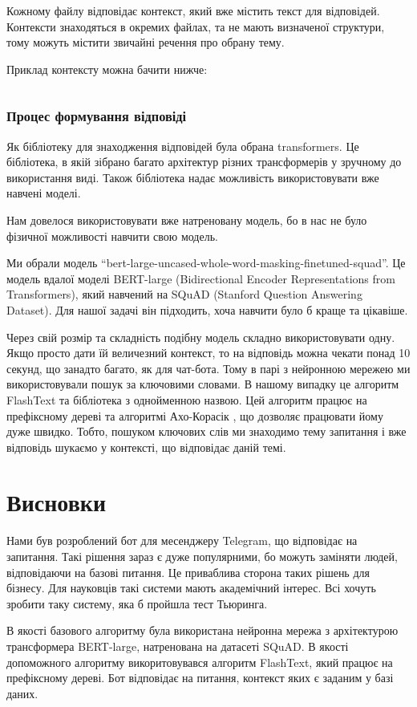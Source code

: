\documentclass[a4paper,14pt]{extreport}
\newcommand\chap[1]{%
  \chapter*{#1}%
  \addcontentsline{toc}{chapter}{\uppercase{#1}}}
\begin{document}
    Кожному файлу відповідає контекст, який вже містить текст для відповідей. Контексти знаходяться в окремих файлах, та не мають визначеної структури, тому можуть містити звичайні речення про обрану тему.

    Приклад контексту можна бачити нижче:

    \inputminted[breaklines,linenos=true]{text}{./ai.txt}

    \subsection{Процес формування відповіді}
    Як бібліотеку для знаходження відповідей була обрана transformers. Це бібліотека, в якій зібрано багато архітектур різних трансформерів у зручному до використання виді. Також бібліотека надає можливість використовувати вже навчені моделі.
    
    Нам довелося використовувати вже натреновану модель, бо в нас не було фізичної можливості навчити свою модель.

    Ми обрали модель ``bert-large-uncased-whole-word-masking-finetuned-squad''. Це модель вдалої моделі BERT-large (Bidirectional Encoder Representations from Transformers), який навчений на SQuAD (Stanford Question Answering Dataset). Для нашої задачі він підходить, хоча навчити було б краще та цікавіше.

    Через свій розмір та складність подібну модель складно використовувати одну. Якщо просто дати їй величезний контекст, то на відповідь можна чекати понад 10 секунд, що занадто багато, як для чат-бота. Тому в парі з нейронною мережею ми використовували пошук за ключовими словами. В нашому випадку це алгоритм FlashText \cite{flashtext:arxiv} та бібліотека \cite{flashtext:repo} з однойменною назвою. Цей алгоритм працює на префіксному дереві та алгоритмі Ахо-Корасік \cite{ahocorasik:wiki}, що дозволяє працювати йому дуже швидко. Тобто, пошуком ключових слів ми знаходимо тему запитання і вже відповідь шукаємо у контексті, що відповідає даній темі.

\chap{Висновки}
    Нами був розроблений бот для месенджеру Telegram, що відповідає на запитання. Такі рішення зараз є дуже популярними, бо можуть заміняти людей, відповідаючи на базові питання. Це приваблива сторона таких рішень для бізнесу. Для науковців такі системи мають академічний інтерес. Всі хочуть зробити таку систему, яка б пройшла тест Тьюринга.
    
    В якості базового алгоритму була використана нейронна мережа з архітектурою трансформера BERT-large, натренована на датасеті SQuAD. В якості допоможного алгоритму викоритовувався алгоритм FlashText, який працює на префіксному дереві. Бот відповідає на питання, контекст яких є заданим у базі даних.
\end{document}
